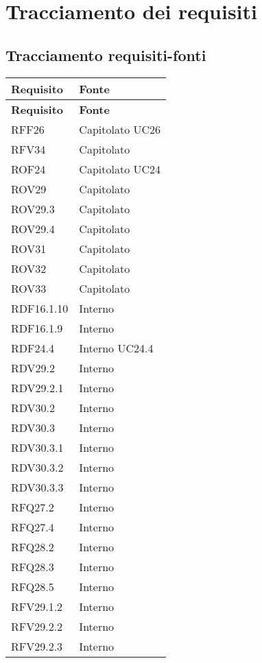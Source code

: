\section{Tracciamento dei requisiti}
\subsection{Tracciamento requisiti-fonti}
\def\arraystretch{1.5}
\begin{longtable}{p{2.5cm}!{\VRule[1pt]}p{2.5cm}}
\color{white} \textbf{Requisito} & \color{white} \textbf{Fonte} \\ 
\endfirsthead 
{} 
\color{white} \textbf{Requisito} & \color{white} \textbf{Fonte} \\ 
\endhead 
RFF26 & Capitolato \newline UC26
 \\
RFV34 & Capitolato \\
ROF24 & Capitolato \newline UC24
 \\
ROV29 & Capitolato \\
ROV29.3 & Capitolato \\
ROV29.4 & Capitolato \\
ROV31 & Capitolato \\
ROV32 & Capitolato \\
ROV33 & Capitolato \\
RDF16.1.10 & Interno \\
RDF16.1.9 & Interno \\
RDF24.4 & Interno \newline UC24.4
 \\
RDV29.2 & Interno \\
RDV29.2.1 & Interno \\
RDV30.2 & Interno \\
RDV30.3 & Interno \\
RDV30.3.1 & Interno \\
RDV30.3.2 & Interno \\
RDV30.3.3 & Interno \\
RFQ27.2 & Interno \\
RFQ27.4 & Interno \\
RFQ28.2 & Interno \\
RFQ28.3 & Interno \\
RFQ28.5 & Interno \\
RFV29.1.2 & Interno \\
RFV29.2.2 & Interno \\
RFV29.2.3 & Interno \\

\end{longtable}
